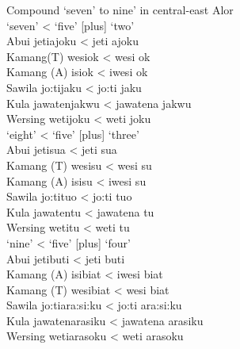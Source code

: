 \let\eachwordone=\rm
\let\eachwordtwo=\it
\let\eachwordthree=\it
\let\eachwordfour=\it
\let\eachwordfive=\it
\let\eachwordsix=\it
\let\eachwordseven=\it

\ea%
\label{ex:6:6}
Compound `seven' to nine' in central-east Alor\\
\ea
\glllllll   { }    		`seven'      		{\textless}  `five'  		[plus]  `two' \\
{\rm Abui}    		{jeti}{{\ng}}{ajoku}    	{\textless}  {jeti}{{\ng}} 	{}   	{ajoku}\\
{\rm Kamang(T)}  	{wesi}{{\ng}}{ok} 	{\textless}  {wesi}{{\ng}}   	{} 	{ok}\\
{\rm Kamang{ }(A)}  		{isi{\ng}ok}      	{\textless}  {iwesi{\ng}}  	{}  	{ok}\\
{\rm Sawila}    	{jo:ti{\ng}jaku}     	{\textless}  {jo:ti{\ng}} 	{}   	{jaku}\\
{\rm Kula}    		{jawatenjakwu}    	{\textless}  {jawatena} 		{} 	{jakwu}\\
{\rm Wersing}  	{weti{\ng}joku}    	{\textless}  {weti{\ng}} 	{}	{joku}\\
\ex 
\glllllll    { } 	`eight'      		{\textless}  `five'  	[plus]  `three'\\
{\rm Abui}    		{jeti}{{\ng}}{sua}    	{\textless}  {jeti{\ng}} 	{} {sua}\\
{\rm Kamang{ }(T)}  	{wesi{\ng}su}   		{\textless}  {wesi{\ng}} {}  {su}\\
{\rm Kamang{ }(A)}  	{isi{\ng}su}      	{\textless}  {iwesi{\ng}} {}  {su}\\
{\rm Sawila}   	 	{jo:ti{\ng}tuo}     	{\textless}  {jo:ti{\ng}}  {}  {tuo}\\
{\rm Kula}    		{jawatentu}   		{\textless} {jawatena} 	{} {tu}\\
{\rm Wersing}  		{weti{\ng}tu}      	{\textless}  {weti{\ng}} 	{}   {tu}\\
\ex   
\glllllll    { }   	`nine'      		{\textless}  `five'  	[plus]  `four' \\
{\rm Abui}    		{jeti}{{\ng}}{buti}    	{\textless}  {jeti{\ng}}  {}    {buti}\\
{\rm Kamang{ }(A)}  	{isi{\ng}biat}   	{\textless}  {iwesi{\ng}}  {}  {biat}\\
{\rm Kamang{ }(T)}	{wesi{\ng}biat}  	{\textless}  {wesi{\ng}}  {}  {biat}\\
{\rm Sawila}   		{jo:ti{\ng}ara:si:ku} 	{\textless}  {jo:ti{\ng}}  {}  {ara:si:ku}\\
{\rm Kula}    		{jawatenarasiku}  	{\textless}  {jawatena}  {}  {arasiku}\\
{\rm Wersing}  		{weti{\ng}arasoku}    	{\textless}  {weti{\ng}}   {}   {arasoku}\\
\z
\z



